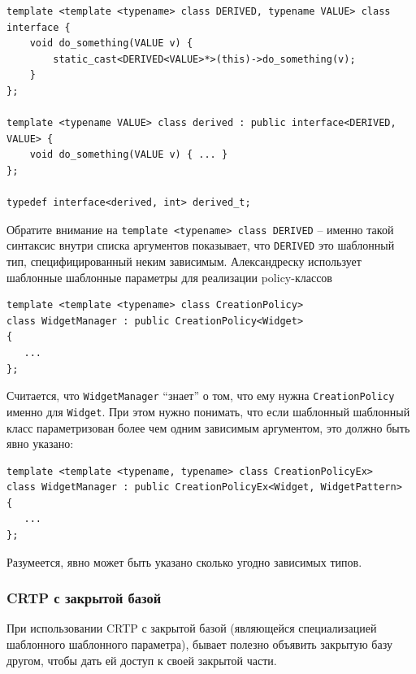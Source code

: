 \documentclass[a4paper,12pt,oneside]{article}
\begin{document}
\begin{lstlisting}
template <template <typename> class DERIVED, typename VALUE> class interface {
    void do_something(VALUE v) {
        static_cast<DERIVED<VALUE>*>(this)->do_something(v);
    }
};

template <typename VALUE> class derived : public interface<DERIVED, VALUE> {
    void do_something(VALUE v) { ... }
};

typedef interface<derived, int> derived_t;
\end{lstlisting}

Обратите внимание на \lstinline!template <typename> class DERIVED! -- именно такой синтаксис внутри списка аргументов показывает, что \lstinline!DERIVED! это шаблонный тип, специфицированный неким зависимым. Александреску\cite{mcpp} использует шаблонные шаблонные параметры для реализации policy-классов

\begin{lstlisting}
template <template <typename> class CreationPolicy>
class WidgetManager : public CreationPolicy<Widget>
{
   ...
};
\end{lstlisting}

Считается, что \lstinline!WidgetManager! ``знает'' о том, что ему нужна \lstinline!CreationPolicy! именно для \lstinline!Widget!. При этом нужно понимать, что если шаблонный шаблонный класс параметризован более чем одним зависимым аргументом, это должно быть явно указано:

\begin{lstlisting}
template <template <typename, typename> class CreationPolicyEx>
class WidgetManager : public CreationPolicyEx<Widget, WidgetPattern>
{
   ...
};
\end{lstlisting}

Разумеется, явно может быть указано сколько угодно зависимых типов.

\subsubsection{CRTP с закрытой базой}

При использовании CRTP с закрытой базой (являющейся специализацией шаблонного шаблонного параметра), бывает полезно объявить закрытую базу другом, чтобы дать ей доступ к своей закрытой части.
\end{document}
